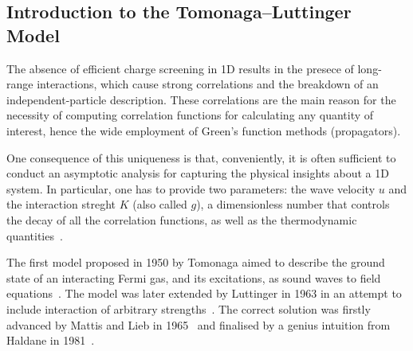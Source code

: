 \subsection{Introduction to the Tomonaga--Luttinger Model}\label{ch2:derivation_tunneling_DOS}

The absence of efficient charge screening in 1D results in the presece of long-range interactions, which cause strong correlations and the breakdown of an independent-particle description. These correlations are the main reason for the necessity of computing correlation functions for calculating any quantity of interest, hence the wide employment of Green's function methods (propagators).

One consequence of this uniqueness is that, conveniently, it is often sufficient to conduct an asymptotic analysis for capturing the physical insights about a 1D system. In particular, one has to provide two parameters: the wave velocity $u$ and the interaction streght $K$ (also called $g$), a dimensionless number that controls the decay of all the correlation functions, as well as the thermodynamic quantities~\cite{cazalilla2011one}.

The first model proposed in 1950 by Tomonaga aimed to describe the ground state of an interacting Fermi gas, and its excitations, as sound waves to field equations~\cite{tomonaga1950remarks}. The model was later extended by Luttinger in 1963 in an attempt to include interaction of arbitrary strengths~\cite{luttinger1963exactly}. The correct solution was firstly advanced by Mattis and Lieb in 1965~\cite{mattis1994exact} and finalised by a genius intuition from Haldane in 1981~\cite{haldane1981luttinger}.

